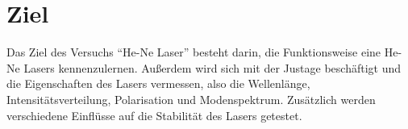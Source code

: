 \section{Ziel}
\label{sec:Ziel}
Das Ziel des Versuchs \enquote{He-Ne Laser} besteht darin, die Funktionsweise eine He-Ne Lasers kennenzulernen.
Außerdem wird sich mit der Justage beschäftigt und die Eigenschaften des Lasers vermessen, also die Wellenlänge, Intensitätsverteilung, Polarisation und Modenspektrum.
Zusätzlich werden verschiedene Einflüsse auf die Stabilität des Lasers getestet.